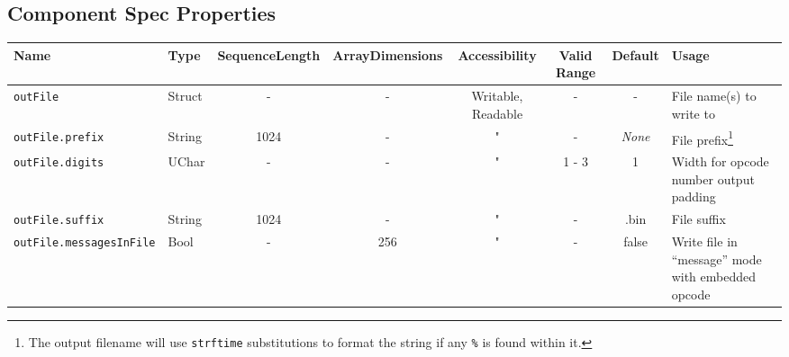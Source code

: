 \documentclass{article}
\begin{document}
\begin{landscape}
  \section*{Component Spec Properties}
  \begin{minipage}{\textwidth}
    \renewcommand*\footnoterule{} %
    \renewcommand{\thempfootnote}{\arabic{mpfootnote}} %
  \begin{scriptsize}
    \begin{tabular}{|p{3cm}|p{1.5cm}|c|c|c|c|c|p{7cm}|}
      \hline
      \rowcolor{blue}
      Name                          & Type      & SequenceLength & ArrayDimensions & Accessibility      & Valid Range & Default       & Usage \\
      \hline
				\verb+outFile+                & Struct    & -              & -               & Writable, Readable & -           & -             & File name(s) to write to                                                                                                                                                                      \\
      \hline
				\verb+outFile.prefix+         & String    & 1024           & -               & "                  & -           & \textit{None} & File prefix\footnote{\label{strftime}The output filename will use \texttt{strftime} substitutions to format the string if any \texttt{\%} is found within it.}                                \\
      \hline
				\verb+outFile.digits+         & UChar     & -              & -               & "                  & 1 - 3       & 1             & Width for opcode number output padding                                                                                                                                                        \\
      \hline
				\verb+outFile.suffix+         & String    & 1024           & -               & "                  & -           & .bin          & File suffix\footnotemark[\getrefnumber{strftime}]                                                                                                                                             \\
      \hline
				\verb+outFile.messagesInFile+ & Bool      & -              & 256             & "                  & -           & false         & Write file in ``message'' mode with embedded opcode                                                                                                                                           \\

\end{tabular}
\end{scriptsize}
\end{minipage}
\end{landscape}
\end{document}
